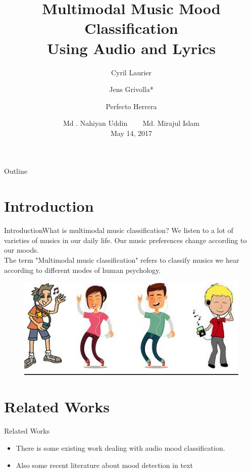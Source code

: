 \documentclass{beamer}
\title{Multimodal Music Mood Classification\\ Using Audio and Lyrics}
\author{Cyril Laurier \and Jens Grivolla* \and Perfecto Herrera}
\institute[] %
{
  Music Technology Group\\
  Universitat Pompeu Fabra
  \and
  Fundació Barcelona Media\\
  Av. Diagonal 177, 08018 Barcelona
  \and
  Music Technology Group\\
  Universitat Pompeu Fabra}
\date{\small Md . Nahiyan Uddin ~~~  Md. Mirajul Islam \\ May 14, 2017}
\begin{document}
\begin{frame}
  \titlepage
\end{frame}

\begin{frame}{Outline}
  \tableofcontents
\end{frame}

\section{Introduction}

\begin{frame}{Introduction}{What is multimodal music classification?}
	We listen to a lot of varieties of musics in our daily life. Our music preferences change according to our moods.\\
	
	The term "Multimodal music classification" refers to classify musics we hear according to different modes of human psychology.
	
\begin{figure}	
\includegraphics[scale = 0.5]{pic}	
  \centering
\end{figure}	
	
\end{frame}

\section{Related Works}

\begin{frame}{Related Works}
  
  \begin{itemize}
  \item {
    There is some existing work dealing with audio mood classification.
  } \pause
  \item {
    Also some recent literature about mood detection in text
  } 
  
  
  
  \end{itemize}
\end{frame}
\end{document}
